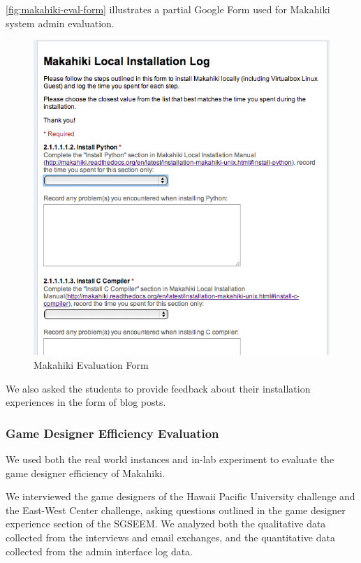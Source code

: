 \documentclass{sigchi}
\begin{document}
\autoref{fig:makahiki-eval-form} illustrates a partial Google Form
used for Makahiki system admin evaluation.

\begin{figure}[ht!]
   \centering
   \includegraphics[width=\columnwidth]{developer-eval-form}
   \caption{Makahiki Evaluation Form}
   \label{fig:makahiki-eval-form}
\end{figure}

We also asked the students to provide feedback about their installation experiences
in the form of blog posts.


\subsubsection{Game Designer Efficiency Evaluation}

We used both the real world instances and in-lab experiment to evaluate the game
designer efficiency of Makahiki.

We interviewed the game designers of the Hawaii Pacific University challenge
 and the East-West Center challenge, asking questions outlined in the game designer
 experience section of the SGSEEM. We analyzed both the qualitative data collected from
the interviews and email exchanges, and the
quantitative data collected from the admin interface log data.
\end{document}
